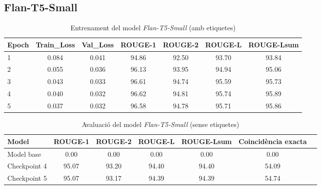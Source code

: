 \subsection{Flan-T5-Small}
\begin{table}[H]
    \centering
    \begin{tabular}{lcccccc}
    \toprule
    Epoch & Train\_Loss & Val\_Loss & ROUGE-1 & ROUGE-2 & ROUGE-L & ROUGE-Lsum \\
    \midrule
    1 & 0.084 & 0.041 & 94.86 & 92.50 & 93.70 & 93.84 \\
    2 & 0.055 & 0.036 & 96.13 & 93.95 & 94.94 & 95.06 \\
    3 & 0.043 & 0.033 & 96.61 & 94.74 & 95.59 & 95.73 \\
    4 & 0.040 & 0.032 & 96.62 & 94.81 & 95.74 & 95.89 \\
    5 & 0.037 & 0.032 & 96.58 & 94.78 & 95.71 & 95.86 \\
    \bottomrule
    \end{tabular}
    \caption[Entrenament del model \textit{Flan-T5-Small}]{Entrenament del model \textit{Flan-T5-Small} (amb etiquetes)}
\end{table}

\begin{table}[H]
    \centering
    \begin{tabular}{lcccccc}
    \toprule
    Model & ROUGE-1 & ROUGE-2 & ROUGE-L & ROUGE-Lsum & Coincidència exacta \\
    \midrule
    Model base & 0.00 & 0.00 & 0.00 & 0.00 & 0.00 \\
    Checkpoint 4 & 95.07 & 93.20 & 94.40 & 94.40 & 54.09 \\
    Checkpoint 5 & 95.07 & 93.17 & 94.39 & 94.39 & 54.74 \\
    \bottomrule
    \end{tabular}
    \caption[Avaluació del model \textit{Flan-T5-Small}]{Avaluació del model \textit{Flan-T5-Small} (sense etiquetes)}
\end{table}







